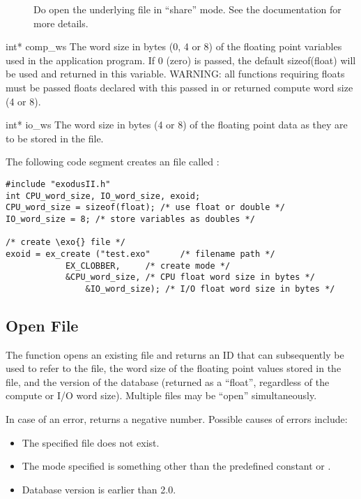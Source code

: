 \begin{parameters}
\begin{description}
\item[] 
Do open the underlying  file in ``share'' mode. See the 
documentation for more details.
\end{description}

\item[{int* comp_ws \RW{}}] 
{The word size in bytes (0, 4 or 8) of the floating point variables
used in the application program. If 0 (zero) is passed, the default
sizeof(float) will be used and returned in this variable. WARNING: all
\exo{} functions requiring floats must be passed floats declared with
this passed in or returned compute word size (4 or 8).}

\item[{int* io_ws \R{}}] {The word size in bytes (4 or 8) of the 
floating point data as they are to be stored in the \exo{} file.}
\end{parameters}

The following code segment creates an \exo{} file called :

\begin{lstlisting}
#include "exodusII.h"
int CPU_word_size, IO_word_size, exoid;
CPU_word_size = sizeof(float); /* use float or double */
IO_word_size = 8; /* store variables as doubles */

/* create \exo{} file */
exoid = ex_create ("test.exo"      /* filename path */
		    EX_CLOBBER,     /* create mode */
		    &CPU_word_size, /* CPU float word size in bytes */
	            &IO_word_size); /* I/O float word size in bytes */
\end{lstlisting}


\subsection{Open \exo{} File}

The function  opens an existing \exo{} file and
returns an ID that can subsequently be used to refer to the file, the
word size of the floating point values stored in the file, and the
version of the \exo{} database (returned as a ``float'', regardless of
the compute or I/O word size). Multiple files may be ``open''
simultaneously.


In case of an error,  returns a negative
number. Possible causes of errors include:

\begin{itemize}
\item The specified file does not exist.

 \item The mode specified is something other than the predefined 
constant  or .


 \item Database version is earlier than 2.0.
\end{itemize}


